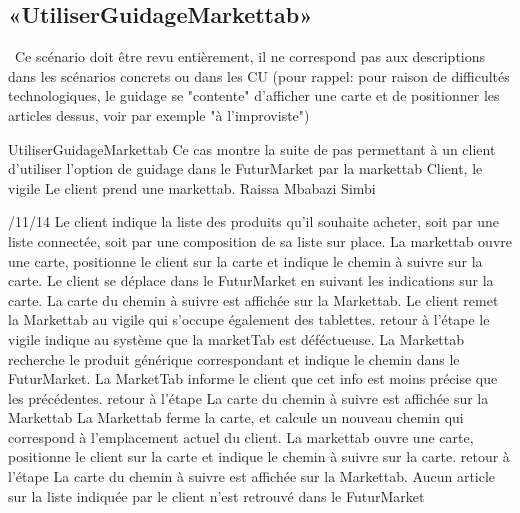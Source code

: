 \subsection{«UtiliserGuidageMarkettab»}
\TODO\ Ce scénario doit être revu entièrement, il ne correspond pas aux descriptions dans les scénarios concrets ou dans les CU (pour rappel: pour raison de difficultés technologiques, le guidage se "contente" d'afficher une carte et de positionner les articles dessus, voir par exemple "à l'improviste")

\startCU
\nom UtiliserGuidageMarkettab
\but Ce cas montre la suite de pas permettant à un client d'utiliser l'option de guidage dans le FuturMarket par la markettab
\acteur Client, le vigile
\precondition Le client prend une markettab.
\auteur Raissa Mbabazi Simbi
\date 7/11/14
\nominal %
\startnominal
{} Le client indique la liste des produits qu'il souhaite acheter, soit par une liste connectée, soit par une composition de sa liste sur place.
\etape[UGM:SE1] La markettab ouvre une carte, positionne le client sur la carte et indique le chemin à suivre sur la carte.
 Le client se déplace dans le FuturMarket en suivant les indications sur la carte.
\stopnominal
\postcondition La carte du chemin à suivre est affichée sur la Markettab.
\alternatifs
{}
\etape Le client remet la Markettab au vigile qui s'occupe également des tablettes.
\etape retour à l'étape 
\stopcondition
\postcondition le vigile indique au système que la marketTab est déféctueuse.
\stopalternatif
\startalternatif[UGM:SE1]
\etape La Markettab recherche le produit générique correspondant et indique le chemin dans le FuturMarket. La MarketTab informe le client que cet info est moins précise que les précédentes.
\etape retour à l'étape 
\stopcondition
\postcondition La carte du chemin à suivre est affichée sur la Markettab
\stopalternatif
\startalternatif[UGM:SE1]
\etape La Markettab ferme la carte, et calcule un nouveau chemin qui correspond à l'emplacement actuel du client. 
\etape La markettab ouvre une carte, positionne le client sur la carte et indique le chemin à suivre sur la carte.
\etape retour à l'étape 
\stopcondition
\postcondition La carte du chemin à suivre est affichée sur la Markettab.
\stopalternatif
\exception
Aucun article sur la liste indiquée par le client n'est retrouvé dans le FuturMarket
\stopCU
